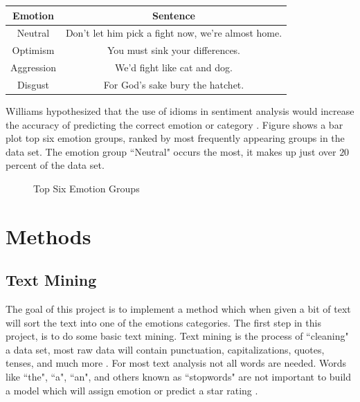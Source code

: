 \documentclass[titlepage,letterpaper]{article}
\begin{document}
 \begin{center}
 	\begin{tabular}{ |c|c| } 
 		\hline
 		Emotion & Sentence \\
 		\hline \hline
 		Neutral & Don't let him pick a fight now, we're almost home. \\
 		\hline
 		Optimism &  You must sink your differences. \\
 		\hline
 		Aggression & We'd fight like cat and dog.  \\ 
 		\hline
 		Disgust & For God's sake bury the hatchet. \\
 		\hline
 	\end{tabular}
 	\label{PrimaryEmotionTable}
 \end{center}

 
 Williams hypothesized that the use of idioms in sentiment analysis would increase the accuracy of predicting the correct emotion or category \cite{lowriwilliams}. Figure  shows a bar plot top six emotion groups, ranked by most frequently appearing groups in the data set. The emotion group ``Neutral" occurs the most, it makes up just over $20$ percent of the data set. 
 
 
% 
 \begin{figure}[htb]
 		\centering
 		\resizebox{4in}{!}{}
 		\caption{Top Six Emotion Groups}\label{topsixgroups}
 \end{figure}
 	
 
\section{Methods}

\subsection{Text Mining}
The goal of this project is to implement a method which when given a bit of text will sort the text into one of the emotions categories. The first step in this project, is to do some basic text mining. Text mining is the process of ``cleaning" a data set, most raw data will contain punctuation, capitalizations, quotes, tenses, and much more \cite{TextMining}. For most text analysis not all words are needed. Words like ``the", ``a", ``an", and others known as ``stopwords" are not important to build a model which will assign emotion or predict a star rating \cite{TextMining}. 
\end{document}
